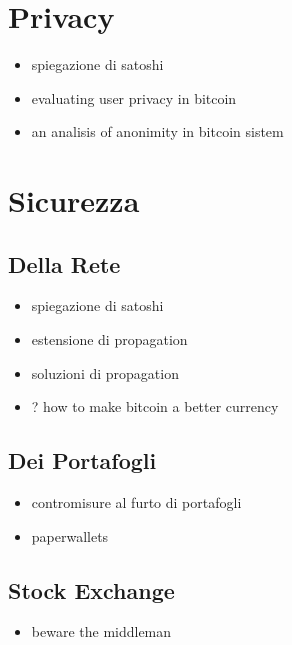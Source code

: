 \chapter{Privacy}\label{privacy}

\begin{itemize}
\itemsep1pt\parskip0pt
\item
  spiegazione di satoshi
\item
  evaluating user privacy in bitcoin
\item
  an analisis of anonimity in bitcoin sistem
\end{itemize}

\chapter{Sicurezza}\label{sicurezza}

\section{Della Rete}\label{della-rete}

\begin{itemize}
\itemsep1pt\parskip0pt
\item
  spiegazione di satoshi
\item
  estensione di propagation
\item
  soluzioni di propagation
\item
  ? how to make bitcoin a better currency
\end{itemize}

\section{Dei Portafogli}\label{dei-portafogli}

\begin{itemize}
\itemsep1pt\parskip0pt
\item
  contromisure al furto di portafogli
\item
  paperwallets
\end{itemize}

\section{Stock Exchange}\label{stock-exchange}

\begin{itemize}
\itemsep1pt\parskip0pt
\item
  beware the middleman
\end{itemize}
